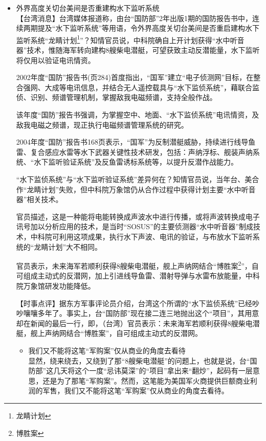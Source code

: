 \documentclass[a4paper,11pt]{article}
\begin{document}
  
\begin{itemize}

\item 外界高度关切台美间是否重建构水下监听系统\\
\label{sec-3_1}%
【台湾消息】台湾媒体报道称，由台“国防部”2年出版1期的国防报告书中，连续两期提及“水下监听系统”等用语，令外界高度关切台美间是否重启建构水下监听系统“龙睛计划\footnote{龙睛计划 }”？知情官员说，中科院确自上开计划获得“水中听音器”技术，惟随海军转向建构8艘柴电潜艇，可望获致主动反潜能量，水下监听将仅用以验证电讯情资。

   2002年度“国防”报告书(页284)首度指出，“国军”建立“电子侦测网”目标，在整合强网、大成等电讯信息，并结合无人遥控载具与“水下监侦系统”，藉联合监侦、识别、频谱管理机制，掌握敌我电磁频谱，支持全般作战。

   该年度“国防”报告书强调，为掌握空中、地面、“水下监侦系统”电讯情资，及敌我电磁之频谱，现正执行电磁频谱管理系统的研究。

   2004年度“国防”报告书168页表示，“国军”为反制潜艇威胁，持续进行线导鱼雷、复合感应水雷等水下武器关键性技术研发，包括：声纳浮标、舰装声纳系统、“水下监听验证系统”及反鱼雷诱标系统等，以提升反潜作战能力。

   “水下监侦系统”与“水下监听验证系统”差异何在？知情官员说，当年台、美合作“龙睛计划”失败，但中科院万象馆仍从合作过程中获得计划主要“水中听音器”相关技术。

   官员描述，这是一种能将电能转换成声波水中进行传播，或将声波转换成电子讯号加以分析应用的技术，是当时“SOSUS”的主要侦测器“水中听音器”制成技术，中科院可利用这项成果，执行水下声波、电讯的验证，与布放水下监听系统的“龙睛计划”大不相同。

   官员表示，未来海军若顺利获得8艘柴电潜艇，舰上声纳网结合“博胜案\footnote{博胜案 }”，自可组成主动式的反潜网，加上引进线导鱼雷、潜射导弹与水雷布放能量，中科院万象馆研发功能降低。

   【时事点评】据东方军事评论员介绍，台湾这个所谓的“水下监侦系统”已经吵吵嚷嚷多年了。事实上，台“国防部”现在接二连三地抛出这个“项目”，其用意却在新闻的最后一行，即，（台湾）官员表示：未来海军若顺利获得8艘柴电潜艇，舰上声纳网结合“博胜案”，自可组成主动式的反潜网。
 
\begin{itemize}

\item 我们又不能将这笔“军购案”仅从商业的角度去看待\\
\label{sec-3_1_1}%
显然，绕来绕去，又绕到了那“8艘柴电潜艇”的问题上，也就是说，台“国防部”这几天将这个一度“忌讳莫深”的“项目”拿出来“翻炒”，起码有一层意思，还是为了那笔“军购案”。然而，这笔能为美国军火商提供巨额商业利润的军售，我们又不能将这笔“军购案”仅从商业的角度去看待。
 


\end{itemize}
\end{itemize}
\end{document}
